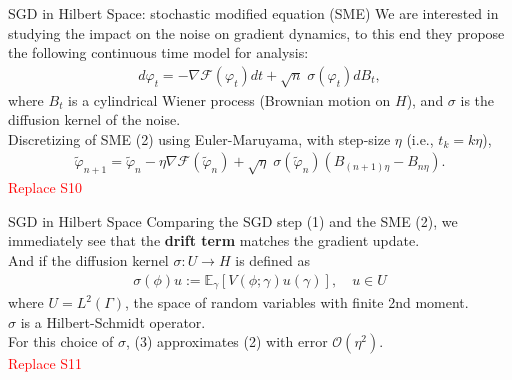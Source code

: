 
\begin{frame}{SGD in Hilbert Space: stochastic modified equation (SME)}
    We are interested in studying the impact on the noise on gradient dynamics, to this end they propose the following continuous time model for analysis:
    \begin{align}
        d\varphi_t = -\nabla \mathcal{F}(\varphi_t)dt + \sqrt{n} \;\sigma(\varphi_t) dB_t,
    \end{align}
    where $B_t$ is a cylindrical Wiener process (Brownian motion on $H$), and $\sigma$ is the diffusion kernel of the noise.\\ 
    Discretizing of SME (2) using Euler-Maruyama, with step-size $\eta$ (i.e., $t_k = k\eta$),
    \begin{align}
        \tilde{\varphi}_{n+1} = \tilde{\varphi}_n - \eta \nabla \mathcal{F}(\tilde{\varphi}_n) + \sqrt{\eta} \; \sigma(\tilde{\varphi}_n)( B_{(n+1)\eta} - B_{n \eta}).
    \end{align}
    \textcolor{red}{Replace S10}
\end{frame}

\begin{frame}{SGD in Hilbert Space}
    Comparing the SGD step (1) and the SME (2), we immediately see that the \textbf{drift term} matches the gradient update.\\
    And if the diffusion kernel $\sigma: U \rightarrow H$ is defined as
    \begin{align*}
        \sigma(\phi)u := \mathbb{E}_{\gamma}[V(\phi; \gamma) u(\gamma)], \quad u \in U
    \end{align*}
    where $U = L^2(\Gamma)$, the space of random variables with finite 2nd moment.\\
    $\sigma$ is a Hilbert-Schmidt operator.\\
    For this choice of $\sigma$, (3) approximates (2) with error $\mathcal{O}(\eta^2)$.\\
    \textcolor{red}{Replace S11}
\end{frame}


